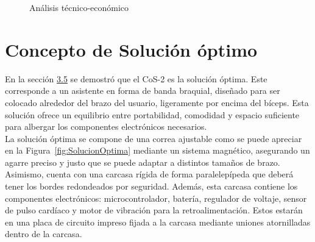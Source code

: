 \begin{figure}[H]
\centering
\begin{center}
\end{center}
\caption{Análisis técnico-económico}
\label{fig:tecnico-economico}
\captionsetup{justification=centering,margin=2cm}
\end{figure}

\section{Concepto de Solución óptimo}

En la sección \hyperref[sc:CH03-ev_tec-eco]{3.5} se demostró que el \ac{CoS}-2 es la solución óptima. Este corresponde a un asistente en forma de banda braquial, diseñado para ser colocado alrededor del brazo del usuario, ligeramente por encima del bíceps. Esta solución ofrece un equilibrio entre portabilidad, comodidad y espacio suficiente para albergar los componentes electrónicos necesarios. \\

La solución óptima se compone de una correa ajustable como se puede apreciar en la Figura~\ref{fig:SolucionOptima} mediante un sistema magnético, asegurando un agarre preciso y justo que se puede adaptar a distintos tamaños de brazo. Asimismo, cuenta con una carcasa rígida de forma paralelepípeda que deberá tener los bordes redondeados por seguridad. Además, esta carcasa contiene los componentes electrónicos: microcontrolador, batería, regulador de voltaje, sensor de pulso cardíaco y motor de vibración para la retroalimentación. Estos estarán en una placa de circuito impreso fijada a la carcasa mediante uniones atornilladas dentro de la carcasa.  \\

